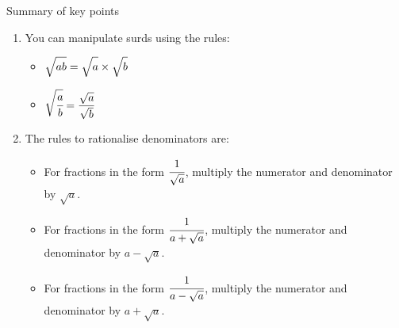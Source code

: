\documentclass[fleqn, twoside]{article}
\begin{document}
\begin{mybox2}[colbacktitle=green]{Summary of key points}
\begin{enumerate}
\begin{multicols}{2}
            \end{multicols}
        \item You can manipulate surds using the rules:
            \begin{multicols}{2}
                \vspace{2mm}
                \begin{itemize}
                    \item $\sqrt{\strut ab}=\sqrt{\strut a}\times\sqrt{\strut b}$
                \end{itemize}
                \columnbreak
                \begin{itemize}
                    \item[] $\sqrt{\cfrac{a}{b}}=\dfrac{\sqrt{a}}{\sqrt{b}}$
                \end{itemize}
            \end{multicols}
        \item The rules to rationalise denominators are:\vspace{-2mm}
        \begin{itemize}
            \setlength{\itemsep}{-3pt}
            \item For fractions in the form $\cfrac{1}{\sqrt{a}}$, multiply the numerator and denominator by $\sqrt{a}$.
            \item For fractions in the form $\cfrac{1}{a+\sqrt{a}}$, multiply the numerator and denominator by $a-\sqrt{a}$.
            \item For fractions in the form $\cfrac{1}{a-\sqrt{a}}$, multiply the numerator and denominator by $a+\sqrt{a}$.
        \end{itemize}
    \end{enumerate}
\end{mybox2}
\end{document}
